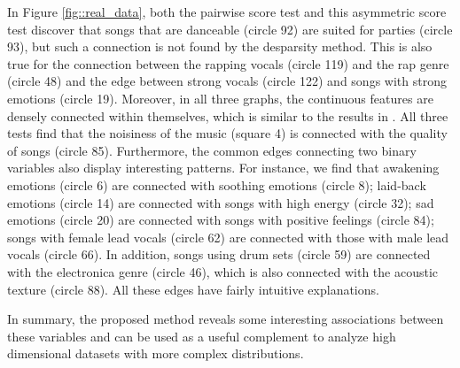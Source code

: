 \documentclass[twoside,11pt]{article}
\begin{document}
In Figure \ref{fig::real_data}, both the pairwise score test and this  asymmetric score test  discover that songs that are danceable (circle 92) are suited for parties (circle 93), but such a connection is not found by the desparsity method.    This is also true for the connection between  the rapping vocals (circle 119) and the   rap genre (circle 48) and the edge between  strong vocals (circle 122) and  songs with strong emotions (circle 19).   Moreover, in all  three graphs, the continuous features are densely connected within  themselves, which is  similar to the results in \cite{cheng2013high}. All three tests find that the noisiness of the music (square 4) is connected with the quality of songs (circle 85). Furthermore, the common edges  connecting two binary variables also display interesting patterns. For instance, we find that awakening emotions (circle 6) are  connected with soothing  emotions (circle 8); laid-back emotions (circle 14) are  connected with  songs with high energy (circle 32);  sad emotions (circle 20) are  connected with songs with positive feelings (circle 84);  songs with female lead vocals (circle 62) are connected with those with male lead vocals (circle 66). In addition, songs using drum sets (circle 59)  are connected with the electronica genre (circle 46), which is also connected with the acoustic texture (circle 88). %
All these edges have fairly intuitive explanations. 

In summary, the proposed method reveals some interesting associations between these variables and can be used as a useful complement to analyze high dimensional datasets with more complex distributions.
\end{document}
